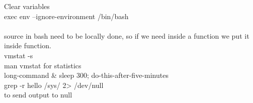\documentclass[11pt, a4paper, oneside]{article}
\theoremstyle{definition}
\begin{document}
Clear variables\\
exec env --ignore-environment /bin/bash\\
\\
source in bash need to be locally done, so if we need inside a function we put it inside function.\\
vmstat -s\\
man vmstat for statistics\\

long-command \& sleep 300; do-this-after-five-minutes\\

grep -r hello /sys/ 2> /dev/null\\ 
to send output to null\\

\end{document}
